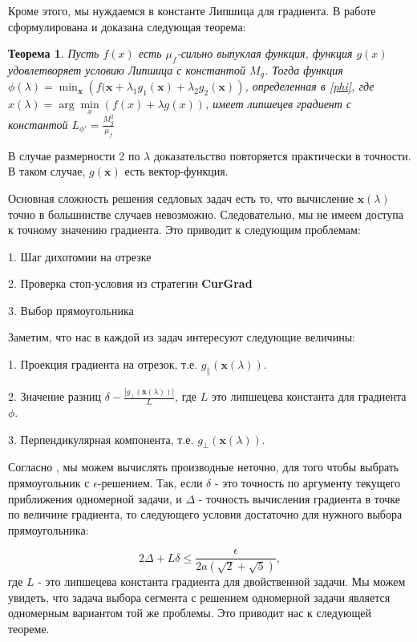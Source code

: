 \documentclass[12pt]{article}
\newtheorem{theorem}{Теорема}[section]
\begin{document}
Кроме этого, мы нуждаемся в константе Липшица для градиента. В работе \cite{Stonykin} сформулирована и доказана следующая теорема:
\begin{theorem}
Пусть $f(x)$ есть $\mu_f$-сильно выпуклая функция, функция $g(x)$ удовлетворяет условию Липшица с константой $M_g$. Тогда функция $\phi(\lambda) = \min_\textbf{x}\left(f(\textbf{x}+\lambda_1g_1(\textbf{x}) + \lambda_2g_2(\textbf{x})\right)$, определенная в \ref{phi}, где $x(\lambda) = \arg\min\limits_x(f(x)+\lambda g(x))$, имеет липшецев градиент с константой $L_{\phi'} = \frac{M_g^2}{\mu_f}$
\end{theorem}

В случае размерности 2 по $\lambda$ доказательство повторяется практически в точности. В таком случае, $g(\textbf{x})$ есть вектор-функция.

Основная сложность решения седловых задач есть то, что вычисление $\textbf{x}(\lambda)$ точно в большинстве случаев невозможно. Следовательно, мы не имеем доступа к точному значению градиента. Это приводит к следующим проблемам:

1. Шаг дихотомии на отрезке

2. Проверка стоп-условия из стратегии \textbf{CurGrad}

3. Выбор прямоугольника

Заметим, что нас в каждой из задач интересуют следующие величины:

1. Проекция градиента на отрезок, т.е. $g_\parallel(\textbf{x}(\lambda))$.

2. Значение разниц $\delta-\frac{|g_\perp(\textbf{x}(\lambda))|}{L}$, где $L$ это липшецева константа для градиента $\phi$.

3. Перпендикулярная компонента, т.е. $g_\perp(\textbf{x}(\lambda))$.

Согласно \cite{Ston_Pas}, мы можем вычислять производные неточно, для того чтобы выбрать прямоугольник с $\epsilon$-решением. Так, если $\delta$ - это точность по аргументу текущего приближения одномерной задачи, и $\Delta$ - точность вычисления градиента в точке по величине градиента, то следующего условия достаточно для нужного выбора прямоугольника:

$$2\Delta + L\delta \leq \frac{\epsilon}{2a(\sqrt{2}+\sqrt{5})},$$
где $L$ - это липшецева константа градиента для двойственной задачи. Мы можем увидеть, что задача выбора сегмента с решением одномерной задачи является одномерным вариантом той же проблемы. Это приводит нас к следующей теореме.
\end{document}

